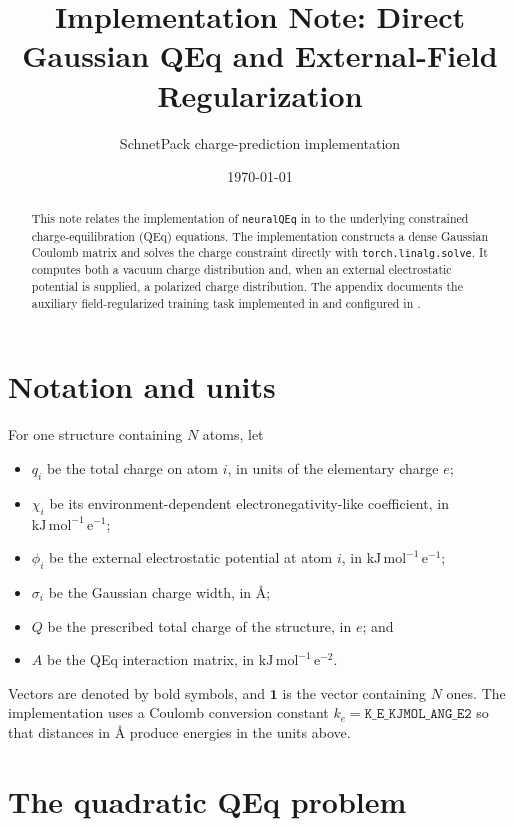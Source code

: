 \documentclass[11pt,a4paper]{article}
\title{Implementation Note: Direct Gaussian QEq and External-Field Regularization}
\author{SchnetPack charge-prediction implementation}
\date{\today}
\newcommand{\vect}[1]{\bm{#1}}
\newcommand{\ones}{\vect{1}}
\begin{document}
\maketitle

\begin{abstract}
This note relates the implementation of \texttt{neuralQEq} in
 to the underlying constrained
charge-equilibration (QEq) equations.  The implementation constructs a dense
Gaussian Coulomb matrix and solves the charge constraint directly with
\texttt{torch.linalg.solve}.  It computes both a vacuum charge distribution and,
when an external electrostatic potential is supplied, a polarized charge
distribution.  The appendix documents the auxiliary field-regularized training
task implemented in  and configured in
.
\end{abstract}

\section{Notation and units}

For one structure containing $N$ atoms, let
\begin{itemize}
  \item $q_i$ be the total charge on atom $i$, in units of the elementary charge $e$;
  \item $\chi_i$ be its environment-dependent electronegativity-like coefficient,
        in \(\mathrm{kJ\,mol^{-1}\,e^{-1}}\);
  \item $\phi_i$ be the external electrostatic potential at atom $i$, in
        \(\mathrm{kJ\,mol^{-1}\,e^{-1}}\);
  \item $\sigma_i$ be the Gaussian charge width, in \AA;
  \item $Q$ be the prescribed total charge of the structure, in $e$; and
  \item $A$ be the QEq interaction matrix, in
        \(\mathrm{kJ\,mol^{-1}\,e^{-2}}\).
\end{itemize}
Vectors are denoted by bold symbols, and $\ones$ is the vector containing $N$
ones.  The implementation uses a Coulomb conversion constant
$k_e=\texttt{K\_E\_KJMOL\_ANG\_E2}$ so that distances in \AA{} produce energies in
the units above.

\section{The quadratic QEq problem}
\end{document}
